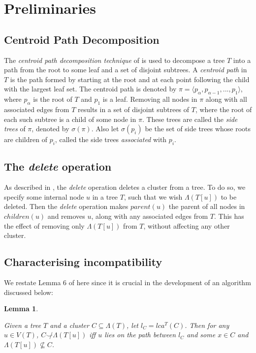 \documentclass{article}
\newcommand{\compatible}{\smile}
\newcommand{\leafset}{\Lambda}
\newtheorem{incompatibility}{Lemma}
\begin{document}
    \section{Preliminaries}
    \label{sec:preliminaries}

    \subsection{Centroid Path Decomposition}

    The \textit{centroid path decomposition technique} of \cite{cole2000n} is used to decompose a tree $T$ into a path from the root to some leaf and a set of disjoint subtrees. A \textit{centroid path} in $T$ is the path formed by starting at the root and at each point following the child with the largest leaf set. The centroid path is denoted by $\pi = \langle p_{\alpha}, p_{\alpha - 1}, ..., p_1 \rangle$, where $p_{\alpha}$ is the root of $T$ and $p_1$ is a leaf. Removing all nodes in $\pi$ along with all associated edges from $T$ results in a set of disjoint subtrees of $T$, where the root of each such subtree is a child of some node in $\pi$. These trees are called the \textit{side trees} of $\pi$, denoted by $\sigma(\pi)$. Also let $\sigma(p_i)$ be the set of side trees whose roots are children of $p_i$, called the side trees \textit{associated} with $p_i$.

    \subsection{The \textit{delete} operation}
    As described in \cite{jansson2018algorithms}, the \textit{delete} operation deletes a cluster from a tree. To do so, we specify some internal node $u$ in a tree $T$, such that we wish $\leafset(T[u])$ to be deleted. Then the \textit{delete} operation makes $parent(u)$ the parent of all nodes in $children(u)$ and removes $u$, along with any associated edges from $T$. This has the effect of removing only $\leafset(T[u])$ from $T$, without affecting any other cluster.

    \subsection{Characterising incompatibility}
    We restate Lemma 6 of \cite{jansson2018algorithms} here since it is crucial in the development of an algorithm discussed below:
    \newline

    \begin{incompatibility}
        \label{lem:incompatibility}

        Given a tree $T$ and a cluster $C \subseteq \leafset(T)$, let $l_C = lca^T(C)$. Then for any $u \in V(T)$, $C \not\compatible \leafset(T[u])$ iff $u$ lies on the path between $l_C$ and some $x \in C$ and $\leafset(T[u]) \not\subseteq C$.
    \end{incompatibility}
\end{document}
